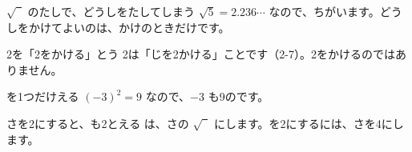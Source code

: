 \begin{tsumazuki}{$\sqrt{\phantom{2}}$ のたしで、どうしをたしてしまう}
$\sqrt{5}=2.236\cdots$ なので、ちがいます。どうしをかけてよいのは、かけのときだけです。
\end{tsumazuki}

\begin{tsumazuki}{2を「2をかける」とう}
2は「じを2かける」ことです（2-7）。2をかけるのではありません。
\end{tsumazuki}

\begin{tsumazuki}{を1つだけえる}
$(-3)^2=9$ なので、$-3$ も9のです。
\end{tsumazuki}

\begin{tsumazuki}{さを2にすると、も2とえる}
は、さの $\sqrt{\phantom{2}}$ にします。を2にするには、さを4にします。
\end{tsumazuki}

